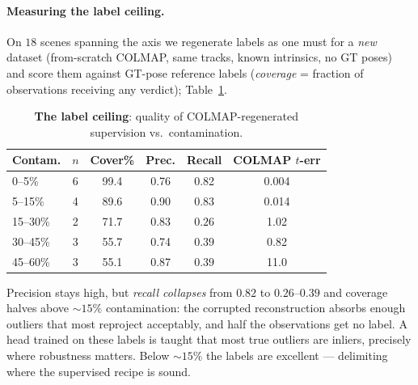 \documentclass[10pt,twocolumn,letterpaper]{article}
\begin{document}
\paragraph{Measuring the label ceiling.} On $18$ scenes spanning the axis we regenerate
labels as one must for a \emph{new} dataset (from-scratch COLMAP, same tracks, known
intrinsics, no GT poses) and score them against GT-pose reference labels (\emph{coverage}
= fraction of observations receiving any verdict); Table~\ref{tab:ceiling}.
\begin{table}[t]\centering\footnotesize
\caption{\textbf{The label ceiling}: quality of COLMAP-regenerated supervision vs.\
contamination.}
\label{tab:ceiling}
\setlength{\tabcolsep}{3.5pt}%
\begin{tabular}{lccccc}
\toprule
Contam. & $n$ & Cover\% & Prec. & Recall & COLMAP $t$-err\\
\midrule
0--5\%    & 6 & 99.4 & 0.76 & 0.82 & 0.004\\
5--15\%   & 4 & 89.6 & 0.90 & 0.83 & 0.014\\
15--30\%  & 2 & 71.7 & 0.83 & $\mathbf{0.26}$ & 1.02\\
30--45\%  & 3 & 55.7 & 0.74 & $\mathbf{0.39}$ & 0.82\\
45--60\%  & 3 & 55.1 & 0.87 & $\mathbf{0.39}$ & 11.0\\
\bottomrule
\end{tabular}
\end{table}
Precision stays high, but \emph{recall collapses} from $0.82$ to $0.26$--$0.39$ and
coverage halves above ${\sim}15\%$ contamination: the corrupted reconstruction absorbs
enough outliers that most reproject acceptably, and half the observations get no label.
A head trained on these labels is taught that most true outliers are inliers, precisely
where robustness matters. Below ${\sim}15\%$ the labels are excellent --- delimiting
where the supervised recipe is sound.
\end{document}
